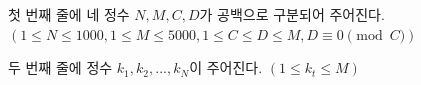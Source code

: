 첫 번째 줄에 네 정수 $N, M, C, D$가 공백으로 구분되어 주어진다. $(1 \leq N \leq 1000, 1 \leq M \leq 5000, 1 \leq C \leq D \leq M, D \equiv 0 \pmod{C})$

두 번째 줄에 정수 $k_1, k_2, ... , k_N$이 주어진다. $(1 \leq k_t \leq M)$
